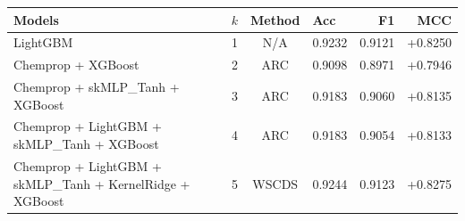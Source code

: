 \begin{tabular}{p{8cm}cclrr}
\toprule
Models & $k$ & Method & Acc & F1 & MCC \\
\midrule
LightGBM & 1 & N/A & 0.9232 & 0.9121 & +0.8250 \\
Chemprop + XGBoost & 2 & ARC & 0.9098 & 0.8971 & +0.7946 \\
Chemprop + skMLP\_Tanh + XGBoost & 3 & ARC & 0.9183 & 0.9060 & +0.8135 \\
Chemprop + LightGBM + skMLP\_Tanh + XGBoost & 4 & ARC & 0.9183 & 0.9054 & +0.8133 \\
Chemprop + LightGBM + skMLP\_Tanh + KernelRidge + XGBoost & 5 & WSCDS & 0.9244 & 0.9123 & +0.8275 \\
\bottomrule
\end{tabular}
